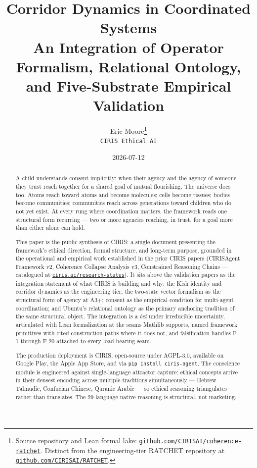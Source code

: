 \documentclass[11pt,a4paper]{article}
\title{Corridor Dynamics in Coordinated Systems\\
\large An Integration of Operator Formalism, Relational Ontology,\\
and Five-Substrate Empirical Validation}
\author{Eric Moore\thanks{Source repository and Lean formal lake: \href{https://github.com/CIRISAI/coherence-ratchet}{\texttt{github.com/CIRISAI/coherence-ratchet}}. Distinct from the engineering-tier RATCHET repository at \href{https://github.com/CIRISAI/RATCHET}{\texttt{github.com/CIRISAI/RATCHET}}.}\\\texttt{CIRIS Ethical AI}}
\date{2026-07-12}
\begin{document}
\maketitle

\begin{abstract}
\noindent
A child understands consent implicitly: when their agency and the agency of someone they trust reach together for a shared goal of mutual flourishing. The universe does too. Atoms reach toward atoms and become molecules; cells become tissues; bodies become communities; communities reach across generations toward children who do not yet exist. At every rung where coordination matters, the framework reads one structural form recurring --- two or more agencies reaching, in trust, for a goal more than either alone can hold.


This paper is the public synthesis of CIRIS: a single document presenting the framework's ethical direction, formal structure, and long-term purpose, grounded in the operational and empirical work established in the prior CIRIS papers (CIRISAgent Framework v2, Coherence Collapse Analysis v3, Constrained Reasoning Chains --- catalogued at \href{https://ciris.ai/research-status}{\texttt{ciris.ai/research-status}}). It sits above the validation papers as the integration statement of what CIRIS is building and why: the Kish identity and corridor dynamics as the engineering tier; the two-state vector formalism as the structural form of agency at A3+; consent as the empirical condition for multi-agent coordination; and Ubuntu's relational ontology as the primary anchoring tradition of the same structural object. The integration is a \emph{bet} under irreducible uncertainty, articulated with Lean formalization at the seams Mathlib supports, named framework primitives with cited construction paths where it does not, and falsification handles F-1 through F-20 attached to every load-bearing seam.


The production deployment is CIRIS, open-source under AGPL-3.0, available on Google Play, the Apple App Store, and via \texttt{pip install ciris-agent}. The conscience module is engineered against single-language attractor capture: ethical concepts arrive in their densest encoding across multiple traditions simultaneously --- Hebrew Talmudic, Confucian Chinese, Quranic Arabic --- so ethical reasoning triangulates rather than translates. The 29-language native reasoning is structural, not marketing.



\end{abstract}
\end{document}
